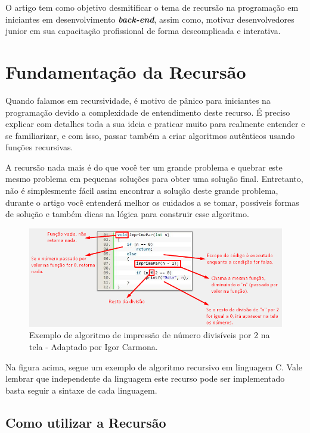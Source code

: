 \documentclass[
	12pt,				%
	oneside,   	        %
	a4paper,			%
	chapter=TITLE,		%
	section=TITLE,		%
	subsection=TITLE,	%
	subsubsection=TITLE,%
	english,			%
	french,				%
	spanish,			%
	brazil,				%
	]{pacotes/abntex2}
\begin{document}
O artigo tem como objetivo desmitificar o tema de recursão na programação em iniciantes em desenvolvimento \textbf{\textit{back-end}}, assim como, motivar desenvolvedores junior em sua capacitação profissional de forma descomplicada e interativa.

\section{\textbf{Fundamentação da Recursão}}
\label{sec:fundamentacao}

Quando falamos em recursividade, é motivo de pânico para iniciantes na programação devido a complexidade de entendimento deste recurso. É preciso explicar com detalhes toda a sua ideia e praticar muito para realmente entender e se familiarizar, e com isso, passar também a criar algoritmos autênticos usando funções recursivas. 

A recursão nada mais é do que você ter um grande problema e quebrar este mesmo problema em pequenas soluções para obter uma solução final. Entretanto, não é simplesmente fácil assim encontrar a solução deste grande problema, durante o artigo você entenderá melhor os cuidados a se tomar, possíveis formas de solução e também dicas na lógica para construir esse algoritmo.

    \begin{figure}[H]
      \centering
      \includegraphics[scale=0.8]{Figuras/rec-adapt.png}
      \caption{Exemplo de algoritmo de impressão de número divisíveis por 2 na tela - Adaptado por Igor Carmona. \cite{imagem1}}
        \label{fig:exemplo1}
    \end{figure}

Na figura acima, segue um exemplo de algoritmo recursivo em linguagem C. Vale lembrar que independente da linguagem este recurso pode ser implementado basta seguir a sintaxe de cada linguagem.

\subsection{\textbf{Como utilizar a Recursão}}
\label{subsec:utilização}
\end{document}
